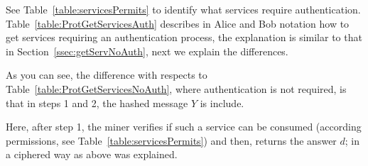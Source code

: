 See Table~\ref{table:servicesPermits} to identify what services require authentication.
Table~\ref{table:ProtGetServicesAuth} describes in Alice and Bob notation how to get services 
requiring an authentication process, the explanation is similar to that in 
Section~\ref{ssec:getServNoAuth}, next we explain the differences. 

As you can see, the difference with respects to 
Table~\ref{table:ProtGetServicesNoAuth}, where authentication is not required, is that in steps
1 and 2, the hashed message $Y$ is include.

Here, after step 1, the miner verifies if such a service can be consumed (according permissions, see
Table~\ref{table:servicesPermits}) and then, returns the answer $d$; in a ciphered way as above was 
explained.









